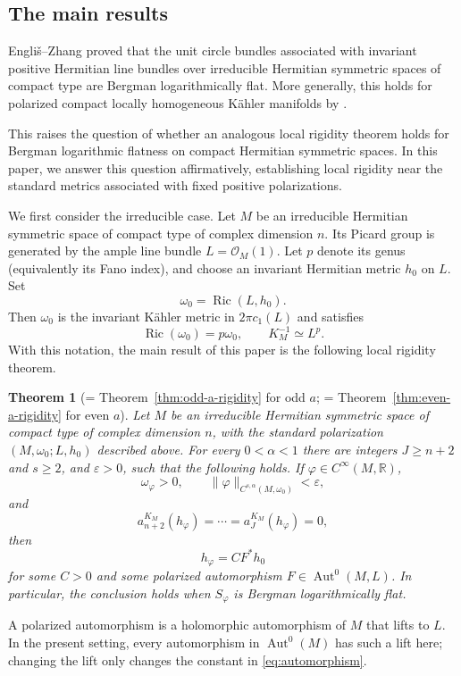 \documentclass[11pt,reqno]{amsart}
\newtheorem{theorem}{Theorem}[section]
\theoremstyle{corollary}
\theoremstyle{conjecture}
\theoremstyle{assumption}
\theoremstyle{proposition}
\theoremstyle{remark}
\numberwithin{equation}{section}
\DeclareMathOperator{\Ric}{Ric}
\begin{document}
\subsection{The main results}
Engli\v{s}--Zhang \cite[Theorems~3.3 and~3.5]{EnglisZhang2010} proved that the unit circle bundles associated with invariant positive Hermitian line bundles over irreducible Hermitian symmetric spaces of compact type are Bergman logarithmically flat. More generally, this holds for polarized compact locally homogeneous K\"ahler manifolds by \cite[Corollary~1.13]{EbenfeltXiaoXu2026}.

This raises the question of whether an analogous local rigidity theorem holds for Bergman logarithmic flatness on compact Hermitian symmetric spaces. In this paper, we answer this question affirmatively, establishing local rigidity near the standard metrics associated with fixed positive polarizations.

We first consider the irreducible case. Let $M$ be an irreducible Hermitian symmetric space of compact type of complex dimension $n$. Its Picard group is generated by the ample line bundle $L=\mathcal O_M(1)$. Let $p$ denote its genus (equivalently its Fano index), and choose an invariant Hermitian metric $h_0$ on $L$. Set
\[
\omega_0=\Ric(L,h_0).
\]
Then $\omega_0$ is the invariant K\"ahler metric in $2\pi c_1(L)$ and satisfies
\[
\Ric(\omega_0)=p\omega_0, \qquad K_M^{-1}\simeq L^p.
\]
With this notation, the main result of this paper is the following local rigidity theorem.

\begin{theorem}[= Theorem~\ref{thm:odd-a-rigidity} for odd $a$; = Theorem~\ref{thm:even-a-rigidity} for even $a$]\label{thm:localrigidity}
Let $M$ be an irreducible Hermitian symmetric space of compact type of complex dimension $n$, with the standard polarization $(M,\omega_0;L,h_0)$ described above. For every $0<\alpha<1$ there are integers $J\geq n+2$ and $s\geq 2$, and $\varepsilon>0$, such that the following holds. If $\varphi\in C^{\infty}(M,\mathbb{R})$,
\[
\omega_{\varphi}>0,\qquad \|\varphi\|_{C^{s,\alpha}(M,\omega_0)}<\varepsilon,
\]
and
\[
a^{K_M}_{n+2}(h_{\varphi})=\cdots=a^{K_M}_{J}(h_{\varphi})=0,
\]
then
\begin{equation}\label{eq:automorphism}
h_{\varphi}=CF^*h_0
\end{equation}
for some $C>0$ and some polarized automorphism $F\in \operatorname{Aut}^0(M,L)$. In particular, the conclusion holds when $S_{\varphi}$ is Bergman logarithmically flat.
\end{theorem}
A polarized automorphism is a holomorphic automorphism of $M$ that lifts to $L$. In the present setting, every automorphism in $\operatorname{Aut}^0(M)$ has such a lift here; changing the lift only changes the constant in \eqref{eq:automorphism}.
\end{document}
